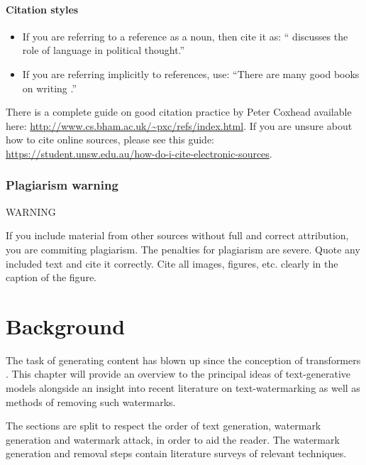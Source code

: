 \documentclass{l4proj}
\theoremstyle{definition}
\begin{document}
\subsubsection{Citation styles}

\begin{itemize}
\item If you are referring to a reference as a noun, then cite it as: ``\citet{Orw68} discusses the role of language in political thought.''
\item If you are referring implicitly to references, use: ``There are many good books on writing \citep{Orw68, Wil09, Pin15}.''
\end{itemize}

There is a complete guide on good citation practice by Peter Coxhead available here: \url{http://www.cs.bham.ac.uk/~pxc/refs/index.html}. 
If you are unsure about how to cite online sources, please see this guide: \url{https://student.unsw.edu.au/how-do-i-cite-electronic-sources}.

\subsection{Plagiarism warning}

\begin{highlight_title}{WARNING}
    
    If you include material from other sources without full and correct attribution, you are commiting plagiarism. The penalties for plagiarism are severe.
    Quote any included text and cite it correctly. Cite all images, figures, etc. clearly in the caption of the figure.
\end{highlight_title}


    
\chapter{Background}
The task of generating content has blown up since the conception of transformers \citep{vaswani2023attention}. This chapter will provide an overview to the principal ideas of text-generative models alongside an insight into recent literature on text-watermarking as well as methods of removing such watermarks. 

The sections are split to respect the order of text generation, watermark generation and watermark attack, in order to aid the reader. The watermark generation and removal steps contain literature surveys of relevant techniques. 
\end{document}
